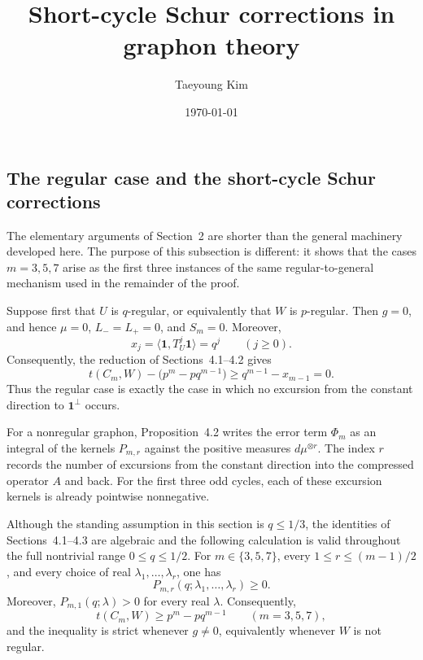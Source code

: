 \documentclass[11pt]{article}
\title{Short-cycle Schur corrections in graphon theory}
\author{Taeyoung Kim}
\date{\today}
\begin{document}
\maketitle

\subsection{The regular case and the short-cycle Schur corrections}
\label{subsec:regular-short-schur}

The elementary arguments of Section~2 are shorter than the general machinery developed here.
The purpose of this subsection is different: it shows that the cases
$m=3,5,7$ arise as the first three instances of the same regular-to-general
mechanism used in the remainder of the proof.

Suppose first that $U$ is $q$-regular, or equivalently that $W$ is
$p$-regular. Then $g=0$, and hence $\mu=0$, $L_-=L_+=0$, and $S_m=0$.
Moreover,
\[
 x_j=\langle \mathbf 1,T_U^j\mathbf 1\rangle=q^j
 \qquad (j\ge 0).
\]
Consequently, the reduction of Sections~4.1--4.2 gives
\[
 t(C_m,W)-\bigl(p^m-pq^{m-1}\bigr)
 \ge q^{m-1}-x_{m-1}=0.
\]
Thus the regular case is exactly the case in which no excursion from the
constant direction to $\mathbf 1^\perp$ occurs.

For a nonregular graphon, Proposition~4.2 writes the error term $\Phi_m$ as
an integral of the kernels $P_{m,r}$ against the positive measures
$d\mu^{\otimes r}$.  The index $r$ records the number of excursions from the
constant direction into the compressed operator $A$ and back.  For the first
three odd cycles, each of these excursion kernels is already pointwise
nonnegative.

\begin{proposition}
\label{prop:short-cycle-excursion-kernels}
Although the standing assumption in this section is $q\le 1/3$, the
identities of Sections~4.1--4.3 are algebraic and the following calculation
is valid throughout the full nontrivial range $0\le q\le 1/2$.
For $m\in\{3,5,7\}$, every
$1\le r\le (m-1)/2$, and every choice of real
$\lambda_1,\ldots,\lambda_r$, one has
\[
 P_{m,r}(q;\lambda_1,\ldots,\lambda_r)\ge 0.
\]
Moreover, $P_{m,1}(q;\lambda)>0$ for every real $\lambda$.  Consequently,
\[
 t(C_m,W)\ge p^m-pq^{m-1}
 \qquad (m=3,5,7),
\]
and the inequality is strict whenever $g\ne 0$, equivalently whenever $W$
is not regular.
\end{proposition}
\end{document}
